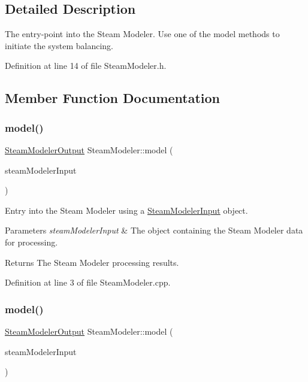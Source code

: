 \subsection{Detailed Description}
The entry-\/point into the Steam Modeler. Use one of the model methods to initiate the system balancing. 

Definition at line 14 of file Steam\+Modeler.\+h.



\subsection{Member Function Documentation}
\mbox{\label{class_steam_modeler_a2d0d297d49be3c9cf856253df508edcb}} 
\subsubsection{\texorpdfstring{model()}{model()}\hspace{0.1cm}{\footnotesize\ttfamily [1/6]}}
{\footnotesize\ttfamily \hyperlink{class_steam_modeler_output}{Steam\+Modeler\+Output} Steam\+Modeler\+::model (\begin{DoxyParamCaption}\item[{const \hyperlink{class_steam_modeler_input}{Steam\+Modeler\+Input} \&}]{steam\+Modeler\+Input }\end{DoxyParamCaption})}

Entry into the Steam Modeler using a \hyperlink{class_steam_modeler_input}{Steam\+Modeler\+Input} object. 
\begin{DoxyParams}{Parameters}
{\em steam\+Modeler\+Input} & The object containing the Steam Modeler data for processing. \\
\hline
\end{DoxyParams}
\begin{DoxyReturn}{Returns}
The Steam Modeler processing results. 
\end{DoxyReturn}


Definition at line 3 of file Steam\+Modeler.\+cpp.

\mbox{\label{class_steam_modeler_a2d0d297d49be3c9cf856253df508edcb}} 
\subsubsection{\texorpdfstring{model()}{model()}\hspace{0.1cm}{\footnotesize\ttfamily [2/6]}}
{\footnotesize\ttfamily \hyperlink{class_steam_modeler_output}{Steam\+Modeler\+Output} Steam\+Modeler\+::model (\begin{DoxyParamCaption}\item[{const \hyperlink{class_steam_modeler_input}{Steam\+Modeler\+Input} \&}]{steam\+Modeler\+Input }\end{DoxyParamCaption})}

